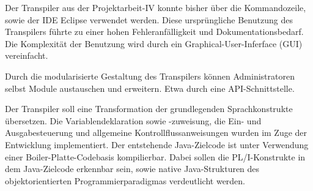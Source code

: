 Der Transpiler aus der Projektarbeit-IV konnte bisher über die Kommandozeile, sowie der IDE Eclipse verwendet werden. Diese ursprüngliche Benutzung des Transpilers führte zu einer hohen Fehleranfälligkeit und Dokumentationsbedarf. Die Komplexität der Benutzung wird durch ein Graphical-User-Inferface (GUI) vereinfacht.

Durch die modularisierte Gestaltung des Transpilers können Administratoren selbst Module austauschen und erweitern. 
Etwa durch eine API-Schnittstelle. 


Der Transpiler soll eine Transformation der grundlegenden Sprachkonstrukte übersetzen. Die Variablendeklaration sowie -zuweisung, die Ein- und Ausgabesteuerung und allgemeine Kontrollflussanweisungen wurden im Zuge der Entwicklung implementiert. Der entstehende Java-Zielcode ist unter Verwendung einer Boiler-Platte-Codebasis kompilierbar. Dabei sollen die PL/I-Konstrukte in dem Java-Zielcode erkennbar sein, sowie native Java-Strukturen des objektorientierten Programmierparadigmas verdeutlicht werden.

%
	
 
    \pagebreak

